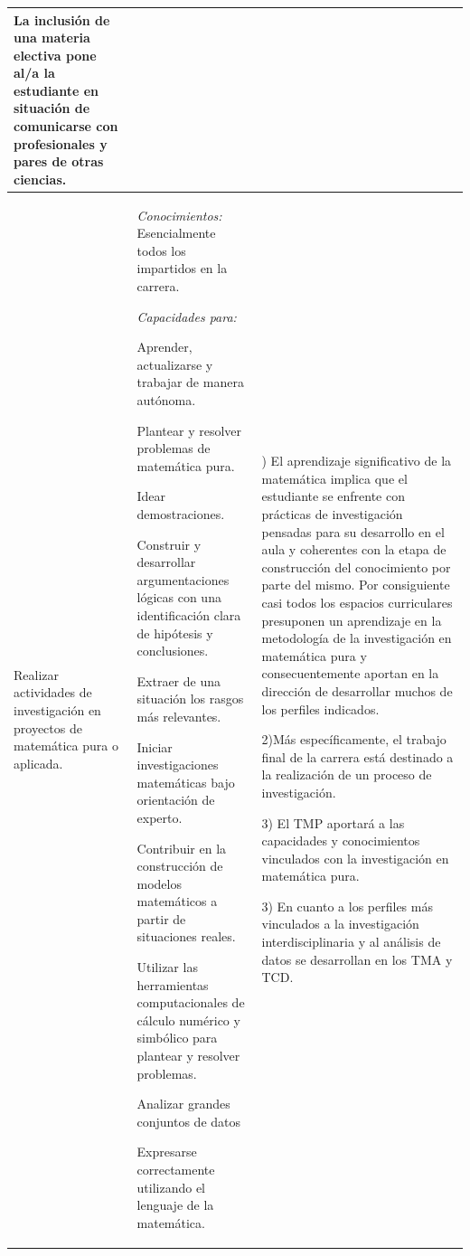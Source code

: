 \documentclass[a4paper, 12pt]{article}
\begin{document}
\begin{center}
\begin{tabularx}{1.0\textwidth}{|>{\raggedright\arraybackslash}X |
>{\raggedright\arraybackslash}X |
>{\raggedright\arraybackslash}X |
}
 La inclusión de una materia electiva pone al/a la estudiante en situación de comunicarse con profesionales y pares de otras ciencias.
 
  \\ \hline

  
  Realizar actividades de investigación en proyectos de matemática pura o aplicada.
  & 
  \emph{Conocimientos:}  Esencialmente todos los impartidos en la carrera.
  
  \emph{Capacidades para:}
  
   Aprender, actualizarse y trabajar de manera autónoma.
   
  Plantear y resolver problemas de matemática pura.
  
 Idear demostraciones.

  Construir y desarrollar argumentaciones lógicas con
una identificación clara de hipótesis y conclusiones.

Extraer de una situación los rasgos más
relevantes.

Iniciar investigaciones matemáticas bajo orientación
de experto.


 Contribuir en la construcción de modelos matemáticos a partir de situaciones reales.
 
Utilizar las herramientas computacionales de cálculo
numérico y simbólico para plantear y resolver problemas.

Analizar grandes conjuntos de datos

Expresarse correctamente utilizando el lenguaje de la matemática.

  
  
  &1) El aprendizaje significativo de la matemática implica que el estudiante se enfrente con prácticas de investigación pensadas para su desarrollo en el aula y coherentes con  la etapa de construcción del conocimiento por parte del mismo. Por consiguiente casi todos los espacios curriculares presuponen un aprendizaje en la metodología de la investigación en matemática pura y consecuentemente aportan en la dirección de desarrollar muchos de los perfiles indicados.
  
  2)Más específicamente, el trabajo final de la carrera está destinado a la realización de un proceso de investigación.
  
  3) El TMP aportará a las capacidades y conocimientos vinculados con la investigación en matemática pura. 
  
  3) En cuanto a los perfiles más vinculados a la investigación interdisciplinaria y al análisis de datos se desarrollan en los TMA y TCD. 
  

\end{tabularx}
\end{center}
\end{document}
